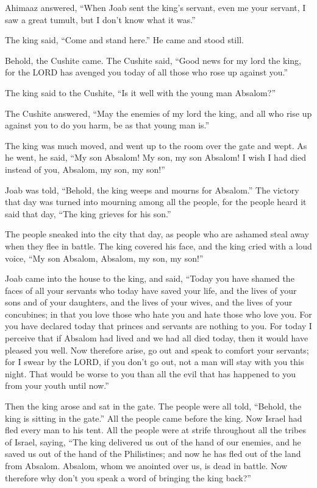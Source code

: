 Ahimaaz answered, “When Joab sent the king’s servant, even me your servant, I saw a great
tumult, but I don’t know what it was.”

\myverse{}The king said, “Come and stand here.” He came and stood still.

\myverse{}Behold, the Cushite came. The Cushite said, “Good news for my
lord the king, for the LORD has avenged you today of all those who rose up against you.”

\myverse{}The king said to the Cushite, “Is it well with the young man
Absalom?”

The Cushite answered, “May the enemies of my lord the king, and all who rise up against you
to do you harm, be as that young man is.”

\myverse{}The king was much moved, and went up to the room over the gate
and wept. As he went, he said, “My son Absalom! My son, my son Absalom! I wish I had died instead of you,
Absalom, my son, my son!”


\mychapter{} \myverse*{}Joab was told, “Behold, the king weeps and mourns for Absalom.”
\myverse{}The victory that day was turned into mourning among all the people, for the
people heard it said that day, “The king grieves for his son.”

\myverse{}The people sneaked into the city that day, as people who are ashamed
steal away when they flee in battle.
\myverse{}The king covered his face, and the king cried with a loud voice, “My son Absalom,
Absalom, my son, my son!”

\myverse{}Joab came into the house to the king, and said, “Today you have
shamed the faces of all your servants who today have saved your life, and the lives of your sons and of
your daughters, and the lives of your wives, and the lives of your concubines;
\myverse{}in that you love those who hate you and hate those who love you. For you have
declared today that princes and servants are nothing to you. For today I perceive that if Absalom had
lived and we had all died today, then it would have pleased you well.
\myverse{}Now therefore arise, go out and speak to comfort your servants; for I swear
by the LORD, if you don’t go out, not a man will stay with you this night. That would be worse to you
than all the evil that has happened to you from your youth until now.”

\myverse{}Then the king arose and sat in the gate. The people were all told,
“Behold, the king is sitting in the gate.” All the people came before the king. Now Israel had fled every
man to his tent.
\myverse{}All the people were at strife throughout all the tribes of Israel, saying,
“The king delivered us out of the hand of our enemies, and he saved us out of the hand of the Philistines;
and now he has fled out of the land from Absalom.
\myverse{}Absalom, whom we anointed over us, is dead in battle. Now therefore why don’t
you speak a word of bringing the king back?”

